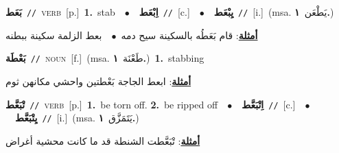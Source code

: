 \documentclass[10pt,a4paper,twoside]{article} %
\begin{document}
\begin{multicols}{2}
{\setlength\topsep{0pt}\textbf{\foreignlanguage{arabic}{بَعَط}}\ {\color{gray}\texttt{//}\color{black}}\ \textsc{verb}\ [p.]\ \textbf{1.}~stab\ \ $\bullet$\ \ \setlength\topsep{0pt}\textbf{\foreignlanguage{arabic}{اِبْعَط}}\ {\color{gray}\texttt{//}\color{black}}\ [c.]\ \ $\bullet$\ \ \setlength\topsep{0pt}\textbf{\foreignlanguage{arabic}{يِبْعَط}}\ {\color{gray}\texttt{//}\color{black}}\ [i.]\ \color{gray}(msa. \foreignlanguage{arabic}{يَطْعَن}~\foreignlanguage{arabic}{\textbf{١.}})\color{black}\  \begin{flushright}\color{gray}\foreignlanguage{arabic}{\textbf{\underline{\foreignlanguage{arabic}{أمثلة}}}: قام بَعَطُه بالسكينة سيح دمه\ $\bullet$\ \  بعط الزلمة سكينة ببطنه}\end{flushright}\color{black}} \vspace{2mm}

{\setlength\topsep{0pt}\textbf{\foreignlanguage{arabic}{بَعْطَة}}\ {\color{gray}\texttt{//}\color{black}}\ \textsc{noun}\ [f.]\ \color{gray}(msa. \foreignlanguage{arabic}{طَعْنَة}~\foreignlanguage{arabic}{\textbf{١.}})\color{black}\ \textbf{1.}~stabbing\  \begin{flushright}\color{gray}\foreignlanguage{arabic}{\textbf{\underline{\foreignlanguage{arabic}{أمثلة}}}: ابعط الجاجة بَعْطتين واحشي مكانهن ثوم}\end{flushright}\color{black}} \vspace{2mm}

{\setlength\topsep{0pt}\textbf{\foreignlanguage{arabic}{تْبَعَّط}}\ {\color{gray}\texttt{//}\color{black}}\ \textsc{verb}\ [p.]\ \textbf{1.}~be torn off.  \textbf{2.}~be ripped off\ \ $\bullet$\ \ \setlength\topsep{0pt}\textbf{\foreignlanguage{arabic}{اِتْبَعَّط}}\ {\color{gray}\texttt{//}\color{black}}\ [c.]\ \ $\bullet$\ \ \setlength\topsep{0pt}\textbf{\foreignlanguage{arabic}{يِتْبَعَّط}}\ {\color{gray}\texttt{//}\color{black}}\ [i.]\ \color{gray}(msa. \foreignlanguage{arabic}{يَتَمَزَّق}~\foreignlanguage{arabic}{\textbf{١.}})\color{black}\  \begin{flushright}\color{gray}\foreignlanguage{arabic}{\textbf{\underline{\foreignlanguage{arabic}{أمثلة}}}: تْبَعَّطت الشنطة قد ما كانت محشية أغراض}\end{flushright}\color{black}} \vspace{2mm}


\end{multicols}
\end{document}
